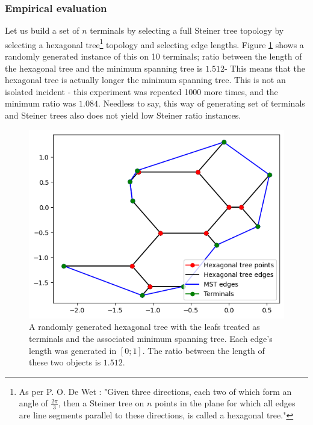 \documentclass{mpaper}
\begin{document}
\subsubsection{Empirical evaluation}

Let us build a set of $n$ terminals by selecting a full Steiner tree topology by selecting a hexagonal tree\footnote{As per P. O. De Wet \cite{po}: "Given three directions, each two of which form an angle of $\frac{2\pi}{3}$, then a
Steiner tree on $n$ points in the plane for which all edges are line segments
parallel to these directions, is called a hexagonal tree."} topology and selecting edge lengths. Figure \ref{fig:17} shows a randomly generated instance of this on 10 terminals; ratio between the length of the hexagonal tree and the minimum spanning tree is $1.512$- This means that the hexagonal tree is actually longer the minimum spanning tree. This is not an isolated incident - this experiment was repeated 1000 more times, and the minimum ratio was $1.084$. Needless to say, this way of generating set of terminals and Steiner trees also does not yield low Steiner ratio instances.

\begin{figure}[h!]
  \begin{center}
  \includegraphics[scale=0.5]{plot15.png}
  \end{center}
  \caption{\label{fig:17} A randomly generated hexagonal tree with the leafs treated as terminals and the associated minimum spanning tree. Each edge's length was generated in $[0;1]$. The ratio between the length of these two objects is $1.512$.}
\end{figure}
\end{document}
